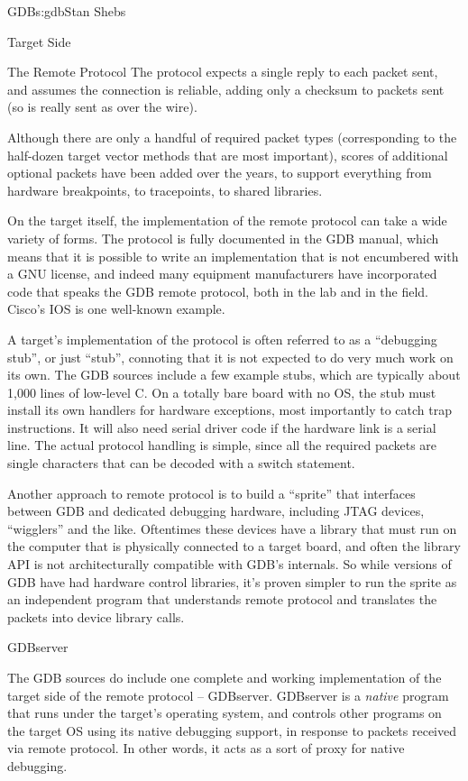 \begin{aosachapter}{GDB}{s:gdb}{Stan Shebs}
\begin{aosasect1}{Target Side}
\begin{aosasect2}{The Remote Protocol}
The protocol expects a single reply to each packet sent, and assumes
the connection is reliable, adding only a checksum to packets sent
(so  is really sent as  over the wire).

Although there are only a handful of required packet types
(corresponding to the half-dozen target vector methods that are most
important), scores of additional optional packets have been added over
the years, to support everything from hardware breakpoints, to
tracepoints, to shared libraries.

On the target itself, the implementation of the remote protocol can
take a wide variety of forms.  The protocol is fully documented in the
GDB manual, which means that it is possible to write an implementation
that is not encumbered with a GNU license, and indeed many equipment
manufacturers have incorporated code that speaks the GDB remote
protocol, both in the lab and in the field.  Cisco's IOS is one
well-known example.

A target's implementation of the protocol is often referred to as a
``debugging stub'', or just ``stub'', connoting that it is not expected
to do very much work on its own.  The GDB sources include a few
example stubs, which are typically about 1,000 lines of low-level C.
On a totally bare board with no OS, the stub must install its own
handlers for hardware exceptions, most importantly to catch trap
instructions.  It will also need serial driver code if the hardware
link is a serial line.  The actual protocol handling is simple, since
all the required packets are single characters that can be decoded
with a switch statement.

Another approach to remote protocol is to build a ``sprite'' that
interfaces between GDB and dedicated debugging hardware, including
JTAG devices, ``wigglers'' and the like.  Oftentimes these devices
have a library that must run on the computer that is physically
connected to a target board, and often the library API is not
architecturally compatible with GDB's internals.  So while versions of
GDB have had hardware control libraries, it's proven simpler to run
the sprite as an independent program that understands remote protocol
and translates the packets into device library calls.

\end{aosasect2}

\begin{aosasect2}{GDBserver}

The GDB sources do include one complete and working implementation of
the target side of the remote protocol -- GDBserver.  GDBserver is a
{\em native} program that runs under the target's operating system,
and controls other programs on the target OS using its native
debugging support, in response to packets received via remote protocol.
In other words, it acts as a sort of proxy for native debugging.


\end{aosasect2}
\end{aosasect1}
\end{aosachapter}
